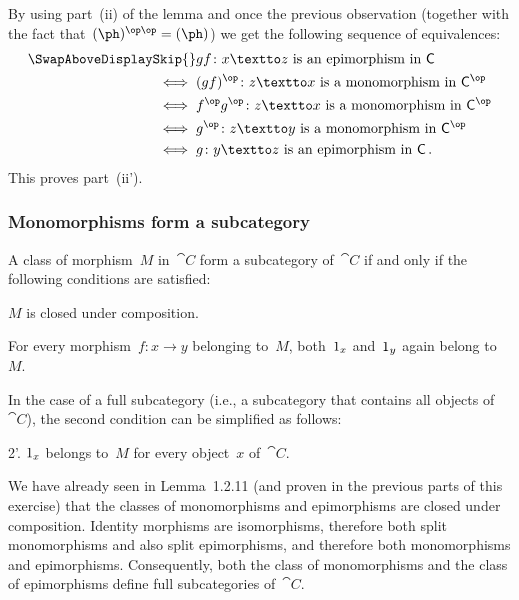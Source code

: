 By using part~(ii) of the lemma and once the previous observation (together with the fact that~$(\ph)^{\op\op} = (\ph)$) we get the following sequence of equivalences:
\begin{align*}
	\SwapAboveDisplaySkip
	{}&
	\text{$gf \colon x \textto z$ is an epimorphism in~$\cat{C}$}
	\\
	\iff{}&
	\text{$(gf)^{\op} \colon z \textto x$ is a monomorphism in~$\cat{C}^{\op}$}
	\\
	\iff{}&
	\text{$f^{\op} g^{\op} \colon z \textto x$ is a monomorphism in~$\cat{C}^{\op}$}
	\\
	\iff{}&
	\text{$g^{\op} \colon z \textto y$ is a monomorphism in~$\cat{C}^{\op}$}
	\\
	\iff{}&
	\text{$g \colon y \textto z$ is an epimorphism in~$\cat{C}$} \,.
\end{align*}
This proves part~(ii').



\subsubsection{Monomorphisms form a subcategory}

A class of morphism~$M$ in~$\cat{C}$ form a subcategory of~$\cat{C}$ if and only if the following conditions are satisfied:
\begin{enumerate*}

	\item
		$M$ is closed under composition.

	\item
		For every morphism~$f \colon x \to y$ belonging to~$M$, both~$1_x$ and~$1_y$ again belong to~$M$.

\end{enumerate*}
In the case of a full subcategory (i.e., a subcategory that contains all objects of~$\cat{C}$), the second condition can be simplified as follows:
\begin{enumerate*}

	\item[2’.]
		$1_x$ belongs to~$M$ for every object~$x$ of~$\cat{C}$.

\end{enumerate*}

We have already seen in Lemma~1.2.11 (and proven in the previous parts of this exercise) that the classes of monomorphisms and epimorphisms are closed under composition.
Identity morphisms are isomorphisms, therefore both split monomorphisms and also split epimorphisms, and therefore both monomorphisms and epimorphisms.
Consequently, both the class of mono\-morphisms and the class of epimorphisms define full subcategories of~$\cat{C}$.
